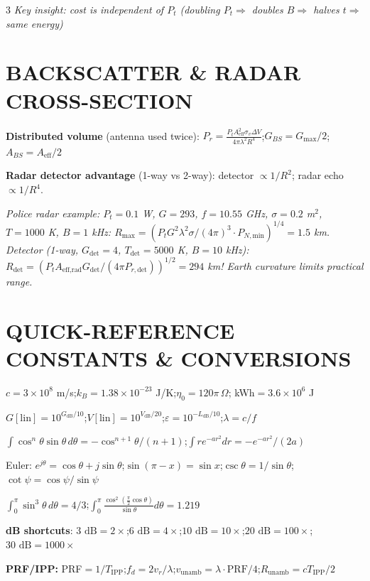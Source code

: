 \documentclass[6pt,landscape]{article}
\begin{document}
\begin{multicols}{3}
\textit{Key insight: cost is independent of $P_t$ (doubling $P_t\Rightarrow$ doubles $B\Rightarrow$ halves $t\Rightarrow$ same energy)}

\section*{BACKSCATTER \& RADAR CROSS-SECTION}
\textbf{Distributed volume} (antenna used twice):
$P_r=\frac{P_t A_\text{eff}^2\sigma_v\Delta V}{4\pi\lambda^2 R^4}$;\quad $G_{BS}=G_\text{max}/2$;\quad $A_{BS}=A_\text{eff}/2$

\textbf{Radar detector advantage} (1-way vs 2-way): detector $\propto1/R^2$; radar echo $\propto1/R^4$.

\textit{Police radar example: $P_t=0.1$ W, $G=293$, $f=10.55$ GHz, $\sigma=0.2$ m$^2$, $T=1000$ K, $B=1$ kHz: $R_\text{max}=(P_t G^2\lambda^2\sigma/(4\pi)^3\cdot P_{N,\text{min}})^{1/4}=1.5$ km. Detector (1-way, $G_\text{det}=4$, $T_\text{det}=5000$ K, $B=10$ kHz): $R_\text{det}=(P_t A_\text{eff,rad}G_\text{det}/(4\pi P_{r,\text{det}}))^{1/2}=294$ km! Earth curvature limits practical range.}

\section*{QUICK-REFERENCE CONSTANTS \& CONVERSIONS}
$c=3\times10^8$ m/s;\quad$k_B=1.38\times10^{-23}$ J/K;\quad$\eta_0=120\pi\,\Omega$; kWh$=3.6\times10^6$ J

$G[\text{lin}]=10^{G_\text{dB}/10}$;\quad$V[\text{lin}]=10^{V_\text{dB}/20}$;\quad$\varepsilon=10^{-L_\text{dB}/10}$;\quad$\lambda=c/f$

$\int\cos^n\theta\sin\theta\,d\theta=-\cos^{n+1}\theta/(n+1)$;\quad$\int re^{-ar^2}dr=-e^{-ar^2}/(2a)$

Euler: $e^{j\theta}=\cos\theta+j\sin\theta$;\quad$\sin(\pi-x)=\sin x$;\quad$\csc\theta=1/\sin\theta$;\quad$\cot\psi=\cos\psi/\sin\psi$

$\int_0^\pi\sin^3\theta\,d\theta=4/3$;\quad$\int_0^\pi\frac{\cos^2(\frac{\pi}{2}\cos\theta)}{\sin\theta}d\theta=1.219$

\textbf{dB shortcuts}: $3\text{ dB}=2\times$;\quad$6\text{ dB}=4\times$;\quad$10\text{ dB}=10\times$;\quad$20\text{ dB}=100\times$;\quad$30\text{ dB}=1000\times$

\textbf{PRF/IPP:} PRF$=1/T_\text{IPP}$;\quad$f_d=2v_r/\lambda$;\quad$v_\text{unamb}=\lambda\cdot\text{PRF}/4$;\quad$R_\text{unamb}=cT_\text{IPP}/2$


\end{multicols}
\end{document}
